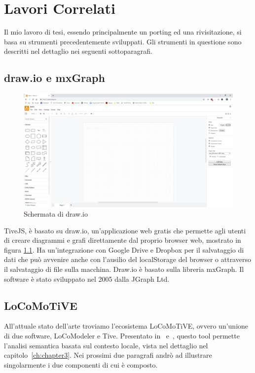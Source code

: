 \chapter{Lavori Correlati}
    Il mio lavoro di tesi, essendo principalmente un porting ed una rivisitazione, si basa su strumenti precedentemente sviluppati.
    Gli strumenti in questione sono descritti nel dettaglio nei seguenti sottoparagrafi.

    \section{draw.io e mxGraph}

    \begin{figure}[htbp]
        \centering
        \includegraphics[scale=0.17]{Figure/drawio.png}
        \caption{Schermata di draw.io}
        \label{fig:drawio}
    \end{figure}

        TiveJS, è basato su draw.io, un'applicazione web gratis che permette agli utenti di creare diagrammi e grafi direttamente dal proprio browser web, mostrato in figura \ref{fig:drawio}. Ha un'integrazione con Google Drive e Dropbox per il salvataggio di dati che può avvenire anche con l'ausilio del localStorage del browser o attraverso il salvataggio di file sulla macchina. Draw.io è basato sulla libreria mxGraph.
        \newline
        Il software è stato sviluppato nel 2005 dalla JGraph Ltd.

    \section{LoCoMoTiVE}
        
        All'attuale stato dell'arte troviamo l'ecosistema LoCoMoTiVE, ovvero un'unione di due software, LoCoModeler e Tive. Presentato in~\cite{extending_localcontext} e~\cite{localcontext}, questo tool permette l'analisi semantica basata sul contesto locale, vista nel dettaglio nel capitolo~\ref{ch:chapter3}. Nei prossimi due paragrafi andrò ad illustrare singolarmente i due componenti di cui è composto.

